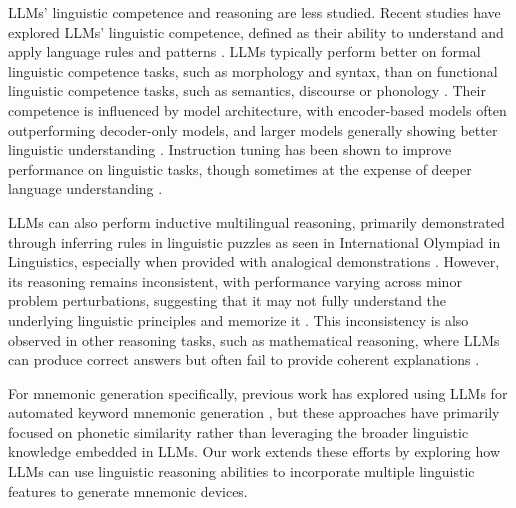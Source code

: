 LLMs' linguistic competence and reasoning are less studied. Recent studies have explored LLMs' linguistic competence, defined as their ability to understand and apply language rules and patterns \citep{waldisHOLMES2024}. LLMs typically perform better on formal linguistic competence tasks, such as morphology and syntax, than on functional linguistic competence tasks, such as semantics, discourse \citep{KhoujaLINGOLYTOO2025} or phonology \citep{suvarnaPhonologyBenchEvaluatingPhonological2024}. Their competence is influenced by model architecture, with encoder-based models often outperforming decoder-only models, and larger models generally showing better linguistic understanding \citep{waldisHOLMES2024}. Instruction tuning has been shown to improve performance on linguistic tasks, though sometimes at the expense of deeper language understanding \citep{waldisHOLMES2024,yinDidYouRead2023}.

LLMs can also perform inductive multilingual reasoning, primarily demonstrated through inferring rules in linguistic puzzles as seen in International Olympiad in Linguistics, especially when provided with analogical demonstrations \citep{RamjiINDUCTIVE2024}. However, its reasoning remains inconsistent, with performance varying across minor problem perturbations, suggesting that it may not fully understand the underlying linguistic principles and memorize it \citep{RamjiINDUCTIVE2024,KhoujaLINGOLYTOO2025}. This inconsistency is also observed in other reasoning tasks, such as mathematical reasoning, where LLMs can produce correct answers but often fail to provide coherent explanations \citep{weiChainofThoughtPromptingElicits2022}.

For mnemonic generation specifically, previous work has explored using LLMs for automated keyword mnemonic generation \citep{LeeSMARTPHONE2023, LeeEXPLORING2024, BalepurSMART2024}, but these approaches have primarily focused on phonetic similarity rather than leveraging the broader linguistic knowledge embedded in LLMs. Our work extends these efforts by exploring how LLMs can use linguistic reasoning abilities to incorporate multiple linguistic features to generate mnemonic devices.
